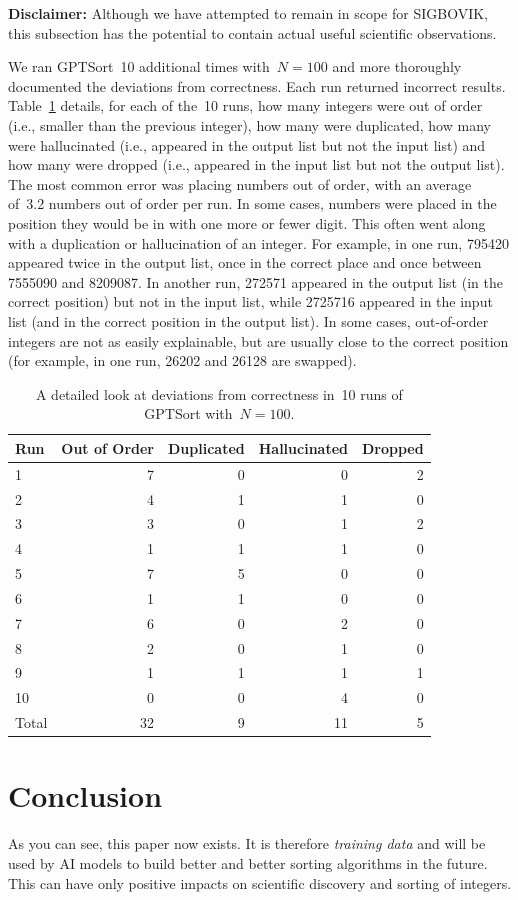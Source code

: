 \documentclass[sigconf]{acmart}\settopmatter{printfolios=false,printccs=false,printacmref=false}
\theoremstyle{definition}
\begin{document}
\textbf{Disclaimer:} Although we have attempted to remain in scope for
SIGBOVIK, this subsection has the potential to contain actual useful
scientific observations.

We ran GPTSort~10 additional times with~$N=100$ and more thoroughly documented
the deviations from correctness.
%
Each run returned incorrect results.
%
Table~\ref{tab:wrong} details, for each of the~10 runs, how many integers
were out of order (i.e., smaller than the previous integer), how many were
duplicated, how many were hallucinated (i.e., appeared in the output list
but not the input list) and how many were dropped (i.e., appeared in the
input list but not the output list).
%
The most common error was placing numbers out of order, with an average
of~3.2 numbers out of order per run.
%
In some cases, numbers were placed in the position they would be in with one
more or fewer digit.
%
This often went along with a duplication or hallucination of an integer.
%
For example, in one run, 795420 appeared twice in the output list, once in
the correct place and once between 7555090 and 8209087.
%
In another run, 272571 appeared in the output list (in the correct position)
but not in the input list, while 2725716 appeared in the input list (and in
the correct position in the output list).
%
In some cases, out-of-order integers are not as easily explainable, but
are usually close to the correct position (for example, in one run,
26202 and 26128 are swapped).
\begin{table}
  \begin{tabular}{l r r r r}
    \toprule
    Run & Out of Order & Duplicated & Hallucinated & Dropped\\
    \midrule
    1 & 7 & 0 & 0 & 2\\
    2 & 4 & 1 & 1 & 0\\
    3 & 3 & 0 & 1 & 2\\
    4 & 1 & 1 & 1 & 0\\
    5 & 7 & 5 & 0 & 0\\
    6 & 1 & 1 & 0 & 0\\
    7 & 6 & 0 & 2 & 0\\
    8 & 2 & 0 & 1 & 0\\
    9 & 1 & 1 & 1 & 1\\
    10 & 0 & 0 & 4 & 0\\
    \midrule
    Total & 32 & 9 & 11 & 5\\
    \bottomrule
  \end{tabular}
  \caption{A detailed look at deviations from correctness in~10 runs
    of GPTSort with~$N = 100$.}
  \label{tab:wrong}
\end{table}

\section{Conclusion}
As you can see, this paper now exists.
%
It is therefore {\em training data} and will be used by AI models to
build better and better sorting algorithms in the future.
%
This can have only positive impacts on scientific discovery and
sorting of integers.

%

\end{document}
